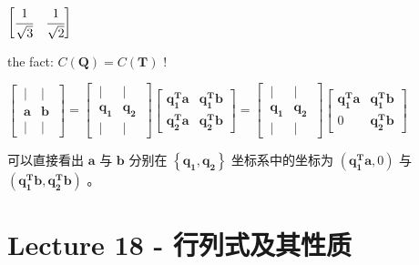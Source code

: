 \documentclass[12pt, a4paper]{article}
\begin{document}
{\begin{math}
\begin{bmatrix}
		\cfrac{1}{\sqrt{3}} & \cfrac{1}{\sqrt{2}} 
	\end{bmatrix}
\end{math}
\vspace{14pt}
\par {\textcolor{anhao-scarlet}{the fact: $C({\mathbf{Q}}) = C({{\mathbf{T}}})$ !}}
\vspace{14pt}
\par 
\begin{math}
	\begin{bmatrix}
		\ | & | \ \\
		\ {\mathbf{a}} & {\mathbf{b}} \ \\
		\ | & | \ 
	\end{bmatrix}
	 = 
	\begin{bmatrix}
		\ | & | \ \\
		\ {\mathbf{q_1}} & {\mathbf{q_2}} \ \\
		\ | & | \ 
	\end{bmatrix}
	\begin{bmatrix}
		{\mathbf{q_1^T}}{\mathbf{a}} & {\mathbf{q_1^T}}{\mathbf{b}} \\
		{\mathbf{q_2^T}}{\mathbf{a}} & {\mathbf{q_2^T}}{\mathbf{b}}
	\end{bmatrix}
	 = 
	\begin{bmatrix}
		\ | & | \ \\
		\ {\mathbf{q_1}} & {\mathbf{q_2}} \ \\
		\ | & | \ 
	\end{bmatrix}
	\begin{bmatrix}
		{\mathbf{q_1^T}}{\mathbf{a}} & {\mathbf{q_1^T}}{\mathbf{b}} \\
		0 & {\mathbf{q_2^T}}{\mathbf{b}}
	\end{bmatrix}
\end{math}
\par 可以直接看出 ${\mathbf{a}}$ 与 ${\mathbf{b}}$ 分别在 $\left\{{\mathbf{q_1}}, {\mathbf{q_2}}\right\}$ 坐标系中的坐标为 $({\mathbf{q_1^T}}{\mathbf{a}}, 0)$ 与 $({\mathbf{q_1^T}}{\mathbf{b}}, {\mathbf{q_2^T}}{\mathbf{b}})$ 。

\newpage
\section{Lecture 18 - 行列式及其性质}
\pagestyle{fancy}
\lhead{}
\rhead{}

}
\end{document}
